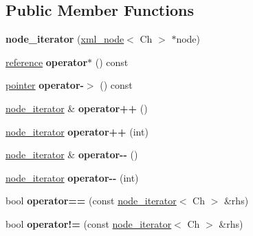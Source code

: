 \subsection*{Public Member Functions}
\begin{DoxyCompactItemize}
\item 
\mbox{\label{classrapidxml_1_1node__iterator_a94c3da59b54e4bd003e226cc35b3c266}} 
{\bfseries node\+\_\+iterator} (\mbox{\hyperlink{classrapidxml_1_1xml__node}{xml\+\_\+node}}$<$ Ch $>$ $\ast$node)
\item 
\mbox{\label{classrapidxml_1_1node__iterator_a47a076383ce706bb88e2b455646d8555}} 
\mbox{\hyperlink{classrapidxml_1_1xml__node}{reference}} {\bfseries operator$\ast$} () const
\item 
\mbox{\label{classrapidxml_1_1node__iterator_a203f946893733b2f8526b49c3c9039ef}} 
\mbox{\hyperlink{classrapidxml_1_1xml__node}{pointer}} {\bfseries operator-\/$>$} () const
\item 
\mbox{\label{classrapidxml_1_1node__iterator_a8d6b184a76b2ec8a8b5e90bc013c80ed}} 
\mbox{\hyperlink{classrapidxml_1_1node__iterator}{node\+\_\+iterator}} \& {\bfseries operator++} ()
\item 
\mbox{\label{classrapidxml_1_1node__iterator_ad01b4e43e348a330984833fd4924d0f2}} 
\mbox{\hyperlink{classrapidxml_1_1node__iterator}{node\+\_\+iterator}} {\bfseries operator++} (int)
\item 
\mbox{\label{classrapidxml_1_1node__iterator_ace52107ecd1bcf02e49619e86206e3a3}} 
\mbox{\hyperlink{classrapidxml_1_1node__iterator}{node\+\_\+iterator}} \& {\bfseries operator-\/-\/} ()
\item 
\mbox{\label{classrapidxml_1_1node__iterator_a4ca35716bb7865f199a137b063af6080}} 
\mbox{\hyperlink{classrapidxml_1_1node__iterator}{node\+\_\+iterator}} {\bfseries operator-\/-\/} (int)
\item 
\mbox{\label{classrapidxml_1_1node__iterator_a5cb8a3b0d65a1a2517995e986a4debfd}} 
bool {\bfseries operator==} (const \mbox{\hyperlink{classrapidxml_1_1node__iterator}{node\+\_\+iterator}}$<$ Ch $>$ \&rhs)
\item 
\mbox{\label{classrapidxml_1_1node__iterator_a20f1e25347d7e3856694f18597f7c8e2}} 
bool {\bfseries operator!=} (const \mbox{\hyperlink{classrapidxml_1_1node__iterator}{node\+\_\+iterator}}$<$ Ch $>$ \&rhs)
\end{DoxyCompactItemize}


